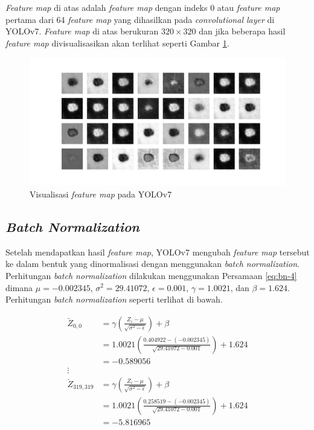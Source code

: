     \textit{Feature map} di atas adalah \textit{feature map} dengan indeks 0 atau \textit{feature map} pertama dari 64 \textit{feature map} yang dihasilkan pada \textit{convolutional layer} di YOLOv7. \textit{Feature map} di atas berukuran $320\times 320$ dan jika beberapa hasil \textit{feature map} divisualisasikan akan terlihat seperti Gambar \ref{fig:d-feamap}.

    \begin{figure}[H]
        \begin{center}
            \includegraphics[width=12cm]{img/bab4/conv-layer.png}
            \caption{Visualisasi \textit{feature map} pada YOLOv7}
            \label{fig:d-feamap}
        \end{center}
    \end{figure}
    
    \subsection{\textit{Batch Normalization}}

    Setelah mendapatkan hasil \textit{feature map}, YOLOv7 mengubah \textit{feature map} tersebut ke dalam bentuk yang dinormalisasi dengan menggunakan \textit{batch normalization}. Perhitungan \textit{batch normalization} dilakukan menggunakan Persamaan \ref{eq:bn-4} dimana $\mu = -0.002345$, $\sigma^2 = 29.41072$, $\epsilon = 0.001$, $\gamma = 1.0021$, dan $\beta = 1.624$. Perhitungan \textit{batch normalization} seperti terlihat di bawah.

    \begin{align*}
        \breve{Z}_{0, 0}     &= \gamma \left( \frac{Z_{i} - \mu}{\sqrt{\sigma^2 - \epsilon}} \right) + \beta \\
                             &= 1.0021 \left( \frac{0.404922 - (-0.002345)}{\sqrt{29.41072 - 0.001}} \right) + 1.624\\
                             &= -0.589056\\
        \vdots\\
        \breve{Z}_{319, 319} &= \gamma \left( \frac{Z_{i} - \mu}{\sqrt{\sigma^2 - \epsilon}} \right) + \beta \\
                             &= 1.0021 \left( \frac{0.258519 - (-0.002345)}{\sqrt{29.41072 - 0.001}} \right) + 1.624\\
                             &= -5.816965\\
    \end{align*}

